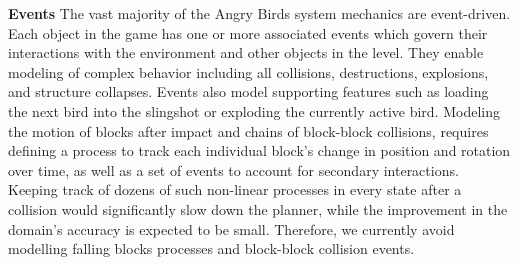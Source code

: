 \documentclass[letterpaper]{article} %
\begin{document}



\noindent\textbf{Events} 
The vast majority of the Angry Birds system mechanics are event-driven. 
Each object in the game has one or more associated events which govern their interactions with the environment and other objects in the level.
They enable modeling of complex behavior including all collisions, destructions, explosions, and structure collapses. Events also model supporting features such as loading the next bird into the slingshot or exploding the currently active bird. 
Modeling the motion of blocks after impact and chains of block-block collisions, requires defining a process to track each individual block's change in position and rotation over time, as well as a set of events to account for secondary interactions. 
Keeping track of dozens of such non-linear processes in every state after a collision would significantly slow down the planner, while the improvement in the domain's accuracy is expected to be small. 
Therefore, we currently avoid modelling falling blocks processes and block-block collision events. %
\end{document}
